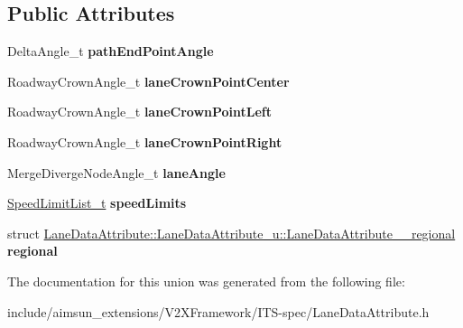 \subsection*{Public Attributes}
\begin{DoxyCompactItemize}
\item 
Delta\+Angle\+\_\+t {\bfseries path\+End\+Point\+Angle}\hypertarget{unionLaneDataAttribute_1_1LaneDataAttribute__u_a7ff1c8bb056089c25a983e44c3b95565}{}\label{unionLaneDataAttribute_1_1LaneDataAttribute__u_a7ff1c8bb056089c25a983e44c3b95565}

\item 
Roadway\+Crown\+Angle\+\_\+t {\bfseries lane\+Crown\+Point\+Center}\hypertarget{unionLaneDataAttribute_1_1LaneDataAttribute__u_a7c0056b90bee264542acb19e348ba5c6}{}\label{unionLaneDataAttribute_1_1LaneDataAttribute__u_a7c0056b90bee264542acb19e348ba5c6}

\item 
Roadway\+Crown\+Angle\+\_\+t {\bfseries lane\+Crown\+Point\+Left}\hypertarget{unionLaneDataAttribute_1_1LaneDataAttribute__u_ae75644e7237ddf486592bc28d08ca3e6}{}\label{unionLaneDataAttribute_1_1LaneDataAttribute__u_ae75644e7237ddf486592bc28d08ca3e6}

\item 
Roadway\+Crown\+Angle\+\_\+t {\bfseries lane\+Crown\+Point\+Right}\hypertarget{unionLaneDataAttribute_1_1LaneDataAttribute__u_a02b3a744caa30001c949a850c8328db0}{}\label{unionLaneDataAttribute_1_1LaneDataAttribute__u_a02b3a744caa30001c949a850c8328db0}

\item 
Merge\+Diverge\+Node\+Angle\+\_\+t {\bfseries lane\+Angle}\hypertarget{unionLaneDataAttribute_1_1LaneDataAttribute__u_a18be81c69fbd57053b6b3c70b25806a4}{}\label{unionLaneDataAttribute_1_1LaneDataAttribute__u_a18be81c69fbd57053b6b3c70b25806a4}

\item 
\hyperlink{structSpeedLimitList}{Speed\+Limit\+List\+\_\+t} {\bfseries speed\+Limits}\hypertarget{unionLaneDataAttribute_1_1LaneDataAttribute__u_ad43b239704605a924fe923b0865e7958}{}\label{unionLaneDataAttribute_1_1LaneDataAttribute__u_ad43b239704605a924fe923b0865e7958}

\item 
struct \hyperlink{structLaneDataAttribute_1_1LaneDataAttribute__u_1_1LaneDataAttribute____regional}{Lane\+Data\+Attribute\+::\+Lane\+Data\+Attribute\+\_\+u\+::\+Lane\+Data\+Attribute\+\_\+\+\_\+regional} {\bfseries regional}\hypertarget{unionLaneDataAttribute_1_1LaneDataAttribute__u_aecc97b13695d39fdf502a2f36f809c1d}{}\label{unionLaneDataAttribute_1_1LaneDataAttribute__u_aecc97b13695d39fdf502a2f36f809c1d}

\end{DoxyCompactItemize}


The documentation for this union was generated from the following file\+:\begin{DoxyCompactItemize}
\item 
include/aimsun\+\_\+extensions/\+V2\+X\+Framework/\+I\+T\+S-\/spec/Lane\+Data\+Attribute.\+h\end{DoxyCompactItemize}
